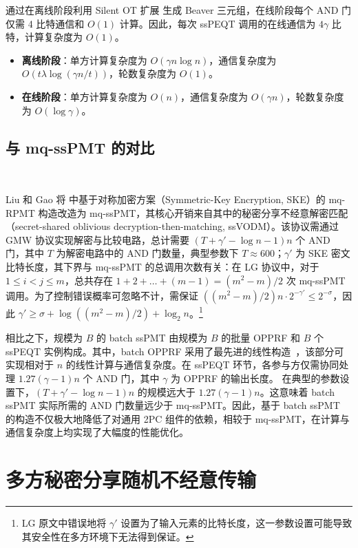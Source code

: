 \begin{trivlist}
通过在离线阶段利用 Silent OT 扩展 \cite{BCGIKRS19} 生成 Beaver 三元组，在线阶段每个 AND 门仅需 4 比特通信和 $O(1)$ 计算。因此，每次 ssPEQT 调用的在线通信为 $4\gamma$ 比特，计算复杂度为 $O(1)$。

\begin{itemize}
    \item \textbf{离线阶段}：单方计算复杂度为 $O(\gamma n \log n)$，通信复杂度为 $O(t \lambda \log (\gamma n / t))$，轮数复杂度为 $O(1)$。
    \item \textbf{在线阶段}：单方计算复杂度为 $O(n)$，通信复杂度为 $O(\gamma n)$，轮数复杂度为 $O(\log \gamma)$。
\end{itemize}
\end{trivlist}

\subsection{与 mq-ssPMT 的对比}~\label{compare:lg}

Liu 和 Gao 将 \cite{ZCLZL-USENIX-2023} 中基于对称加密方案（Symmetric-Key Encryption, SKE）的 mq-RPMT 构造改造为 mq-ssPMT，其核心开销来自其中的秘密分享不经意解密匹配（secret-shared oblivious decryption-then-matching, ssVODM）。该协议需通过 GMW 协议实现解密与比较电路，总计需要 $(T + \gamma' - \log n - 1)n$ 个 AND 门，其中 $T$ 为解密电路中的 AND 门数量，典型参数下 $T \approx 600$；$\gamma'$ 为 SKE 密文比特长度，其下界与 mq-ssPMT 的总调用次数有关：在 LG 协议中，对于 $1 \le i < j \le m$，总共存在 $1 + 2 + \dots + (m-1) = (m^2 - m) / 2$ 次 mq-ssPMT 调用。为了控制错误概率可忽略不计，需保证 $((m^2 - m) / 2) n \cdot 2^{-\gamma'} \le 2^{-\sigma}$，因此 $\gamma' \ge \sigma + \log((m^2 - m) / 2) + \log_2 n$。\footnote{LG 原文中错误地将 $\gamma'$ 设置为了输入元素的比特长度，这一参数设置可能导致其安全性在多方环境下无法得到保证。}

相比之下，规模为 $B$ 的 batch ssPMT 由规模为 $B$ 的批量 OPPRF 和 $B$ 个 ssPEQT 实例构成。其中，batch OPPRF 采用了最先进的线性构造~\cite{CGS22,RS-EUROCRYPT-2021,RR-CCS-2022}，该部分可实现相对于 $n$ 的线性计算与通信复杂度。在 ssPEQT 环节，各参与方仅需协同处理 $1.27 (\gamma-1) n$ 个 AND 门，其中 $\gamma$ 为 OPPRF 的输出长度。
在典型的参数设置下，$(T + \gamma' - \log n - 1) n$ 的规模远大于 $1.27 (\gamma-1) n$。这意味着 batch ssPMT 实际所需的 AND 门数量远少于 mq-ssPMT。因此，基于 batch ssPMT 的构造不仅极大地降低了对通用 2PC 组件的依赖，相较于 mq-ssPMT，在计算与通信复杂度上均实现了大幅度的性能优化。

\section{多方秘密分享随机不经意传输}

